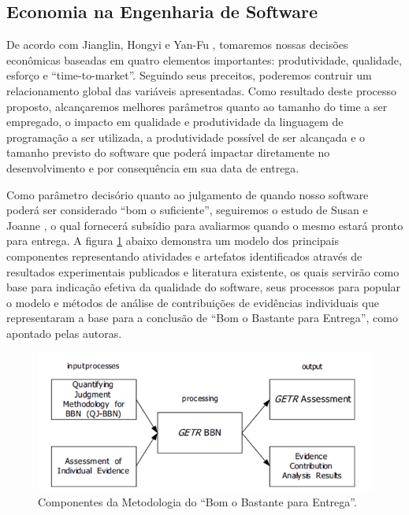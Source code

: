 \documentclass[12pt]{article}
\begin{document}
\subsection{Economia na Engenharia de Software}

De acordo com Jianglin, Hongyi e Yan-Fu \cite{Huang2015} , tomaremos nossas decisões econômicas baseadas em quatro elementos importantes: produtividade, qualidade, esforço e “time-to-market”. Seguindo seus preceitos, poderemos contruir um relacionamento global das variáveis apresentadas. Como resultado deste processo proposto, alcançaremos melhores parâmetros quanto ao tamanho do time a ser empregado, o impacto em qualidade e produtividade da linguagem de programação a ser utilizada, a produtividade possível de ser alcançada e o tamanho previsto do software que poderá impactar diretamente no desenvolvimento e por consequência em sua data de entrega.

Como parâmetro decisório quanto ao julgamento de quando nosso software poderá ser considerado “bom o suficiente”, seguiremos o estudo de Susan e Joanne \cite{donohue2005}, o qual fornecerá subsídio para avaliarmos quando o mesmo estará pronto para entrega. A figura \ref{fig:exampleFig6} abaixo demonstra um modelo dos principais componentes representando atividades e artefatos identificados através de resultados experimentais publicados e literatura existente, os quais servirão como base para indicação efetiva da qualidade do software, seus processos para popular o modelo e métodos de análise de contribuições de evidências individuais que representaram a base para a conclusão de “Bom o Bastante para Entrega”, como apontado pelas autoras.

\begin{figure}[htp]
\centering
\includegraphics[scale=.8] {swebok_economia.png}
\caption{Componentes da Metodologia do “Bom o Bastante para Entrega”.}
\label{fig:exampleFig6}
\end{figure}




%
%
\end{document}
